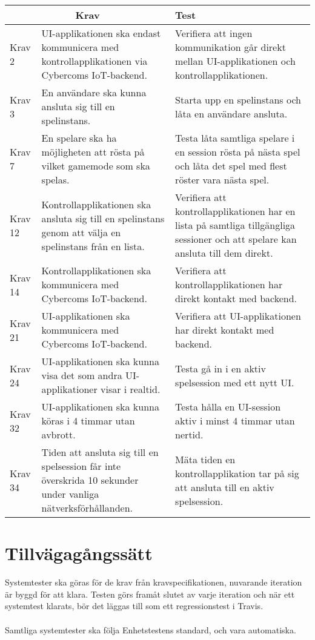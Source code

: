 	\begin{tabular}{| p{1.5cm} | p{6cm} | p{8cm}|}
	
  \hline
    \multicolumn{2}{|c|}{Krav}&{Test}\\
    \hline
		Krav 2&UI-applikationen ska endast kommunicera med \newline kontrollapplikationen via Cybercoms IoT-backend.&Verifiera att ingen kommunikation går direkt mellan UI-applikationen och kontrollapplikationen.\\
		\hline
		Krav 3& En användare ska kunna ansluta sig till en spelinstans. &Starta upp en spelinstans och låta en användare ansluta. \\
		\hline
		Krav 7& En spelare ska ha möjligheten att rösta på vilket gamemode som ska spelas. & Testa låta samtliga spelare i en session rösta på nästa spel och låta det spel med flest röster vara nästa spel.\\
		\hline
		Krav 12& Kontrollapplikationen ska ansluta sig till en spelinstans genom att välja en spelinstans från en lista. & Verifiera att kontrollapplikationen har en lista på samtliga tillgängliga sessioner och att spelare kan ansluta till dem direkt. \\
		\hline
		Krav 14& Kontrollapplikationen ska kommunicera med Cybercoms IoT-backend. & Verifiera att kontrollapplikationen har direkt kontakt med backend. \\
		\hline
		Krav 21& UI-applikationen ska kommunicera med Cybercoms IoT-backend. & Verifiera att UI-applikationen har direkt kontakt med backend. \\
		\hline
		Krav 24& UI-applikationen ska kunna visa det som andra UI-applikationer visar i realtid. & Testa gå in i en aktiv spelsession med ett nytt UI. \\
		\hline
		Krav 32& UI-applikationen ska kunna köras i 4 timmar utan avbrott. & Testa hålla en UI-session aktiv i minst 4 timmar utan nertid. \\
		\hline
		Krav 34& Tiden att ansluta sig till en spelsession får inte överskrida 10 sekunder under vanliga nätverksförhållanden. & Mäta tiden en kontrollapplikation tar på sig att ansluta till en aktiv spelsession. \\
		\hline

   
  \end{tabular}
  
  

	
	


\section{Tillvägagångssätt}
	Systemtester ska göras för de krav från kravspecifikationen, nuvarande iteration är byggd för att klara. Testen görs framåt slutet av varje iteration och när ett systemtest klarats, bör det läggas till som ett regressionstest i Travis.\\
	\\
	Samtliga systemtester ska följa Enhetstestens standard, och vara automatiska. 		
	
